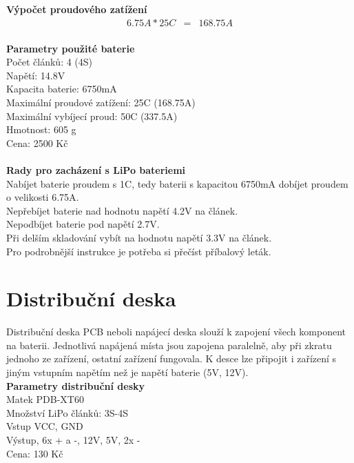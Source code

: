 \textbf{Výpočet proudového zatížení}
\begin{eqnarray*} 
	6.75A * 25C & = & 168.75A\\
\end{eqnarray*} 

\textbf{Parametry použité baterie}\\
Počet článků: 4 (4S)\\
Napětí: 14.8V\\
Kapacita baterie: 6750mA\\
Maximální proudové zatížení: 25C (168.75A)\\
Maximální vybíjecí proud: 50C (337.5A)\\
Hmotnost: 605 g\\
Cena: 2500 Kč\\
\cite{baterie}\\

\textbf{Rady pro zacházení s LiPo bateriemi}\\
Nabíjet baterie proudem s 1C, tedy baterii s kapacitou 6750mA dobíjet proudem o velikosti 6.75A.\\
Nepřebíjet baterie nad hodnotu napětí 4.2V na článek.\\
Nepodbíjet baterie pod napětí 2.7V.\\
Při delším skladování vybít na hodnotu napětí 3.3V na článek.\\
Pro podrobnější instrukce je potřeba si přečíst příbalový leták.\\

\section{Distribuční deska} 
Distribuční deska PCB neboli napájecí deska slouží k zapojení všech  komponent na baterii. Jednotlivá napájená místa jsou zapojena paralelně, aby při zkratu jednoho ze zařízení, ostatní zařízení fungovala. K desce lze připojit i zařízení s jiným vstupním napětím než je napětí baterie (5V, 12V).\\

\textbf{Parametry distribuční desky}\\
Matek PDB-XT60\\
Množství LiPo článků: 3S-4S\\
Vstup VCC, GND\\
Výstup, 6x + a -, 12V, 5V, 2x -\\
Cena: 130 Kč\\
\cite{pdb}\\


